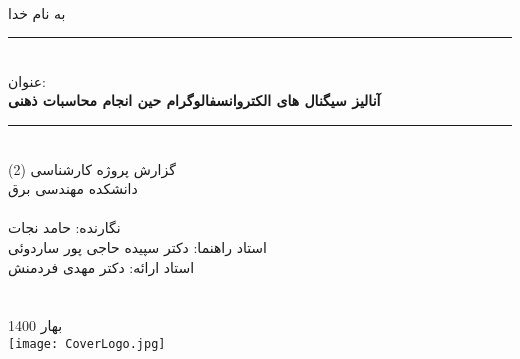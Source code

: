 \documentclass[11pt]{extarticle}
\begin{document}
\begin{titlepage}
\newcommand{\HRule}{\rule{\linewidth}{0.1mm}} 
\centering %
\textsc{ }\\[0cm] 
\textsc{\Large به نام خدا  
}\\[0.5cm] %

\HRule \\[0.4cm]
{
	عنوان:
	\\
	 \huge \bfseries آنالیز سیگنال های الکتروانسفالوگرام حین انجام محاسبات ذهنی
}\\[0.1cm] %

\HRule \\[1.5cm]
 گزارش پروژه کارشناسی (2)
 \\
\textsc{\huge دانشکده مهندسی برق
}\\[0.5cm] %
\textsc{}\\[0.5cm] %



\textsc{\Large نگارنده: حامد نجات}
\\[0.5cm]
\textsc{\Large استاد راهنما: دکتر سپیده حاجی پور ساردوئی}
\\
\textsc{\Large استاد ارائه: دکتر مهدی فردمنش}
\\[0.5cm]


\emph{}\\ 
\textsc{}
\\[0.5cm]


{\large بهار 1400}\\[1cm] %
\texttt{[image: CoverLogo.jpg]}\\[0.2cm] 
\textsc{\newline}
\textsc{ }\\[0.5cm] 
\vfill %

\end{titlepage}
\end{document}
